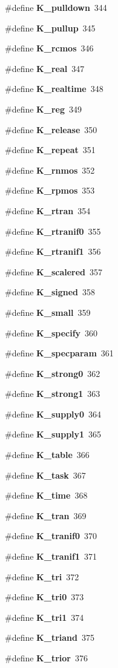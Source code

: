 \begin{CompactItemize}
\item 
\#define {\bf K\_\-pulldown}\ 344
\item 
\#define {\bf K\_\-pullup}\ 345
\item 
\#define {\bf K\_\-rcmos}\ 346
\item 
\#define {\bf K\_\-real}\ 347
\item 
\#define {\bf K\_\-realtime}\ 348
\item 
\#define {\bf K\_\-reg}\ 349
\item 
\#define {\bf K\_\-release}\ 350
\item 
\#define {\bf K\_\-repeat}\ 351
\item 
\#define {\bf K\_\-rnmos}\ 352
\item 
\#define {\bf K\_\-rpmos}\ 353
\item 
\#define {\bf K\_\-rtran}\ 354
\item 
\#define {\bf K\_\-rtranif0}\ 355
\item 
\#define {\bf K\_\-rtranif1}\ 356
\item 
\#define {\bf K\_\-scalered}\ 357
\item 
\#define {\bf K\_\-signed}\ 358
\item 
\#define {\bf K\_\-small}\ 359
\item 
\#define {\bf K\_\-specify}\ 360
\item 
\#define {\bf K\_\-specparam}\ 361
\item 
\#define {\bf K\_\-strong0}\ 362
\item 
\#define {\bf K\_\-strong1}\ 363
\item 
\#define {\bf K\_\-supply0}\ 364
\item 
\#define {\bf K\_\-supply1}\ 365
\item 
\#define {\bf K\_\-table}\ 366
\item 
\#define {\bf K\_\-task}\ 367
\item 
\#define {\bf K\_\-time}\ 368
\item 
\#define {\bf K\_\-tran}\ 369
\item 
\#define {\bf K\_\-tranif0}\ 370
\item 
\#define {\bf K\_\-tranif1}\ 371
\item 
\#define {\bf K\_\-tri}\ 372
\item 
\#define {\bf K\_\-tri0}\ 373
\item 
\#define {\bf K\_\-tri1}\ 374
\item 
\#define {\bf K\_\-triand}\ 375
\item 
\#define {\bf K\_\-trior}\ 376

\end{CompactItemize}
